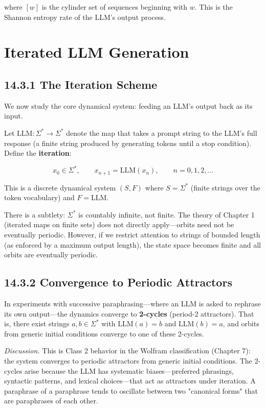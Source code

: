 where $[w]$ is the cylinder set of sequences beginning with $w$. This is the Shannon entropy rate of the LLM's output process.



\section{Iterated LLM Generation}

\subsection{14.3.1 The Iteration Scheme}

We now study the core dynamical system: feeding an LLM's output back as its input.

\begin{definition}
Let $\mathrm{LLM}: \Sigma^* \to \Sigma^*$ denote the map that takes a prompt string to the LLM's full response (a finite string produced by generating tokens until a stop condition). Define the \textbf{iteration}:

\[x_0 \in \Sigma^*, \qquad x_{n+1} = \mathrm{LLM}(x_n), \qquad n = 0, 1, 2, \ldots\]

This is a discrete dynamical system $(S, F)$ where $S = \Sigma^*$ (finite strings over the token vocabulary) and $F = \mathrm{LLM}$.
\end{definition}

\begin{remark}
There is a subtlety: $\Sigma^*$ is countably infinite, not finite. The theory of Chapter 1 (iterated maps on finite sets) does not directly apply---orbits need not be eventually periodic. However, if we restrict attention to strings of bounded length (as enforced by a maximum output length), the state space becomes finite and all orbits are eventually periodic.
\end{remark}

\subsection{14.3.2 Convergence to Periodic Attractors}

\begin{theorem}[Wang et al., 2025]
In experiments with successive paraphrasing---where an LLM is asked to rephrase its own output---the dynamics converge to \textbf{2-cycles} (period-2 attractors). That is, there exist strings $a, b \in \Sigma^*$ with $\mathrm{LLM}(a) = b$ and $\mathrm{LLM}(b) = a$, and orbits from generic initial conditions converge to one of these 2-cycles.

\textit{Discussion.} This is Class 2 behavior in the Wolfram classification (Chapter 7): the system converges to periodic attractors from generic initial conditions. The 2-cycles arise because the LLM has systematic biases---preferred phrasings, syntactic patterns, and lexical choices---that act as attractors under iteration. A paraphrase of a paraphrase tends to oscillate between two "canonical forms" that are paraphrases of each other.
\end{theorem}

